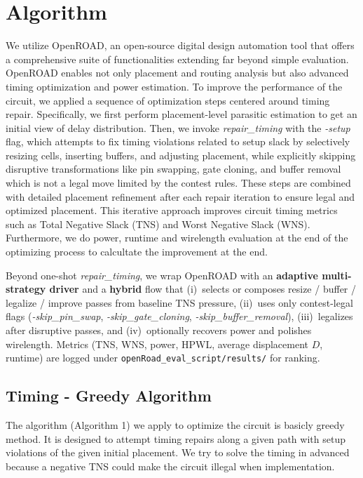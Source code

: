 \documentclass[conference]{IEEEtran}
\begin{document}
\section{Algorithm}
We utilize OpenROAD\cite{OpenROAD}, an open-source digital design automation tool that offers a comprehensive suite of functionalities extending far beyond simple evaluation. OpenROAD\cite{OpenROAD} enables not only placement and routing analysis but also advanced timing optimization and power estimation. To improve the performance of the circuit, we applied a sequence of optimization steps centered around timing repair. Specifically, we first perform placement-level parasitic estimation to get an initial view of delay distribution. Then, we invoke \textit{repair\_timing} with the \textit{-setup} flag, which attempts to fix timing violations related to setup slack by selectively resizing cells, inserting buffers, and adjusting placement, while explicitly skipping disruptive transformations like pin swapping, gate cloning, and buffer removal which is not a legal move limited by the contest rules. These steps are combined with detailed placement refinement after each repair iteration to ensure legal and optimized placement. This iterative approach improves circuit timing metrics such as Total Negative Slack (TNS) and Worst Negative Slack (WNS). Furthermore, we do power, runtime and wirelength evaluation at the end of the optimizing process to calcultate the improvement at the end.

Beyond one-shot \textit{repair\_timing}, we wrap OpenROAD with an \textbf{adaptive multi-strategy driver} and a \textbf{hybrid} flow that (i)~selects or composes resize / buffer / legalize / improve passes from baseline TNS pressure, (ii)~uses only contest-legal flags (\textit{-skip\_pin\_swap}, \textit{-skip\_gate\_cloning}, \textit{-skip\_buffer\_removal}), (iii)~legalizes after disruptive passes, and (iv)~optionally recovers power and polishes wirelength. Metrics (TNS, WNS, power, HPWL, average displacement $D$, runtime) are logged under \texttt{openRoad\_eval\_script/results/} for ranking.

\subsection{Timing - Greedy Algorithm}
The algorithm (Algorithm 1) we apply to optimize the circuit is basicly greedy method. It is designed to attempt timing repairs along a given path with setup violations of the given initial placement. We try to solve the timing in advanced because a negative TNS could make the circuit illegal when implementation. 
\end{document}
